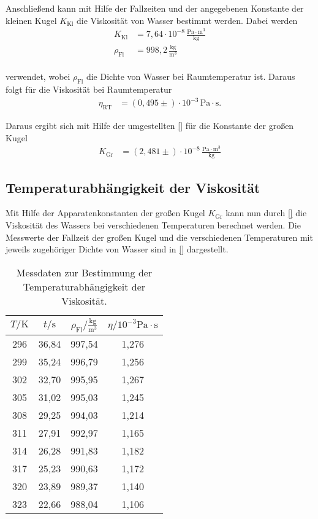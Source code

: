 Anschließend kann mit Hilfe der Fallzeiten und der angegebenen Konstante der kleinen Kugel $K_{\text{Kl}}$ die Viskosität von Wasser bestimmt werden. Dabei werden
\begin{align*}
  K_{\text{Kl}} &= 7,64\cdot 10^{-8} \,\frac{\si{\pascal}\cdot\si{\meter^3}}{\si{\kilogram}} \\
  \rho_{\text{Fl}} &= 998,2\,\frac{\si{\kilogram}}{\si{\meter^3}} \\
\end{align*}

verwendet, wobei $\rho_{\text{Fl}}$ die Dichte von Wasser bei Raumtemperatur ist. Daraus folgt für die Viskosität bei Raumtemperatur
\begin{align*}
  \eta_{\text{RT}} &= (0,495\pm ) \cdot 10^{-3} \,\si{\pascal}\cdot\si{\second}.
\end{align*}

Daraus ergibt sich mit Hilfe der umgestellten \autoref{} für die Konstante der großen Kugel
\begin{align*}
  K_{\text{Gr}} &= (2,481\pm ) \cdot 10^{-8} \,\frac{\si{\pascal}\cdot\si{\meter^3}}{\si{\kilo\gram}}
\end{align*}



\subsection{Temperaturabhängigkeit der Viskosität}
Mit Hilfe der Apparatenkonstanten der großen Kugel $K_{\text{Gr}}$ kann nun durch \autoref{} die Viskosität des Wassers bei verschiedenen Temperaturen berechnet werden.
Die Messwerte der Fallzeit der großen Kugel und die verschiedenen Temperaturen mit jeweils zugehöriger Dichte von Wasser sind in \autoref{} dargestellt.

\begin{table}
  \centering
  \caption{Messdaten zur Bestimmung der Temperaturabhängigkeit der Viskosität.}
  \label{tab:Temp}
  \begin{tabular}{c c c c}
    \toprule
    $T/\si{\kelvin}$ & $t/\si{\second}$ & $\rho_{\text{Fl}}/\frac{\si{\kilogram}}{\si{\meter^3}}$ & $\eta/10^{-3}\si{\pascal}\cdot \si{\second}$\\
    \midrule
    296 & 36,84 & 997,54 & 1,276 \\
    299 & 35,24 & 996,79 & 1,256 \\
    302 & 32,70 & 995,95 & 1,267 \\
    305 & 31,02 & 995,03 & 1,245 \\
    308 & 29,25 & 994,03 & 1,214 \\
    311 & 27,91 & 992,97 & 1,165 \\
    314 & 26,28 & 991,83 & 1,182 \\
    317 & 25,23 & 990,63 & 1,172 \\
    320 & 23,89 & 989,37 & 1,140 \\
    323 & 22,66 & 988,04 & 1,106 \\
    \bottomrule
  \end{tabular}
\end{table}

